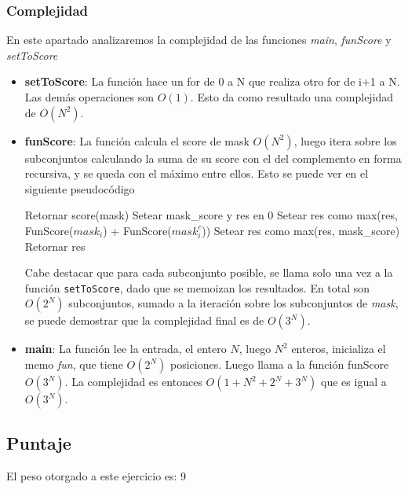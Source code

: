 \subsubsection{Complejidad}

En este apartado analizaremos la complejidad de las funciones \textit{main}, \textit{funScore} y \textit{setToScore}

\begin{itemize}
	\item \textbf{setToScore}: La funci\'on hace un for de 0 a N que realiza otro for de i+1 a N. Las dem\'as operaciones son $O(1)$. Esto da como resultado una complejidad de $O(N^2)$.

	\item \textbf{funScore}: La funci\'on calcula el score de mask $O(N^2)$, luego itera sobre los subconjuntos calculando la suma de su score con el del complemento en forma recursiva, y se queda con el m\'aximo entre ellos. Esto se puede ver en el siguiente pseudoc\'odigo

\begin{algorithmic}
		 Retornar score(mask)
		\EndIf
		\State Setear mask\_score y res en 0
			\State Setear res como max(res, FunScore($mask_i$) + FunScore($mask_i^c$))
		\EndFor
		\State Setear res como max(res, mask\_score)
		\State Retornar res
	\EndFunction
\end{algorithmic}

	Cabe destacar que para cada subconjunto posible, se llama solo una vez a la funci\'on \texttt{setToScore}, dado que se memoizan los resultados. En total son $O(2^N)$ subconjuntos, sumado a la iteraci\'on sobre los subconjuntos de \textit{mask}, se puede demostrar que la complejidad final es de $O(3^N)$.

	\item \textbf{main}: La funci\'on lee la entrada, el entero $N$, luego $N^2$ enteros, inicializa el memo \textit{fun}, que tiene $O(2^N)$ posiciones. Luego llama a la funci\'on funScore $O(3^N)$. La complejidad es entonces $O(1 + N^2 + 2^N + 3^N)$ que es igual a $O(3^N)$.
\end{itemize}

\subsection{Puntaje}
El peso otorgado a este ejercicio es: 9